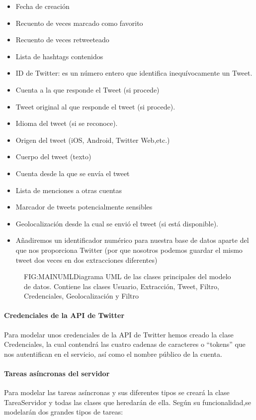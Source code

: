 \begin{itemize}
	\item Fecha de creación
	\item Recuento de veces marcado como favorito
	\item Recuento de veces retweeteado
	\item Lista de hashtags contenidos
	\item ID de Twitter: es un número entero que identifica inequívocamente un Tweet.
	\item Cuenta a la que responde el Tweet (si procede)
	\item Tweet original al que responde el tweet (si procede).
	\item Idioma del tweet (si se reconoce).
	\item Origen del tweet (iOS, Android, Twitter Web,etc.)
	\item Cuerpo del tweet (texto)
	\item Cuenta desde la que se envía el tweet
	\item Lista de menciones a otras cuentas
	\item Marcador de tweets potencialmente sensibles
	\item Geolocalización desde la cual se envió el tweet (si está disponible).
	\item Añadiremos un identificador numérico para nuestra base de datos aparte del que nos proporciona Twitter (por que nosotros podemos guardar el mismo tweet dos veces en dos extracciones diferentes)
\end{itemize}

\begin{figure}[Diagrama UML Principal]{FIG:MAINUML}{Diagrama UML de las clases principales del modelo de datos. Contiene las clases Usuario, Extracción, Tweet, Filtro, Credenciales, Geolocalización y Filtro}
\end{figure}

\paragraph{Credenciales de la API de Twitter}
Para modelar unos credenciales de la API de Twitter hemos creado la clase Credenciales, la cual contendrá las cuatro cadenas de caracteres o ``tokens'' que nos autentifican en el servicio, así como el nombre público de la cuenta. 

\paragraph{Tareas asíncronas del servidor}
Para modelar las tareas asíncronas y sus diferentes tipos se creará la clase TareaServidor y todas las clases que heredarán de ella.
Según su funcionalidad,se modelarán dos grandes tipos de tareas:

